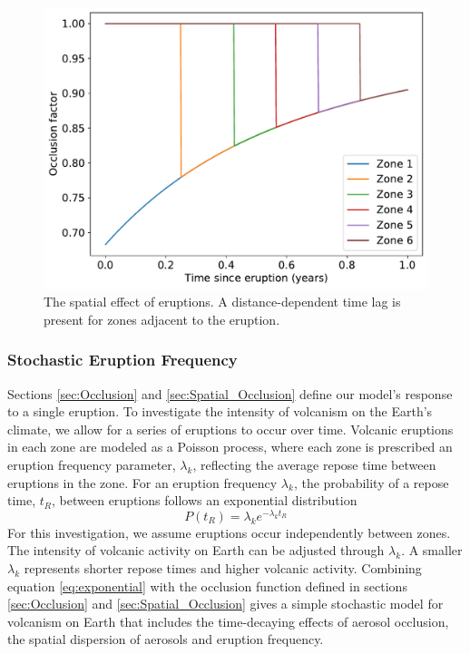 \documentclass[12pt]{article}
\begin{document}
\begin{figure}[H]
    \centering
    \includegraphics[scale=0.6]{occlusion_space.pdf}
    \caption{
        The spatial effect of eruptions. A distance-dependent time lag is
        present for zones adjacent to the eruption.
    }
    \label{fig:occlusion_space}
\end{figure}
\FloatBarrier

\subsubsection{Stochastic Eruption Frequency} \label{sec:Stochastic}
Sections \ref{sec:Occlusion} and \ref{sec:Spatial_Occlusion} define our model's
response to a single eruption. To investigate the intensity of
volcanism on the Earth's climate, we allow for a series of eruptions to occur
over time. Volcanic eruptions in each zone are modeled as a Poisson
process, where each zone is prescribed an eruption frequency parameter,
$\lambda_k$, reflecting the average repose time between eruptions in the zone.
For an eruption frequency $\lambda_k$, the probability of a repose time, $t_{R}$,
between eruptions follows an exponential distribution
\begin{equation} \label{eq:exponential}
P(t_{R}) = \lambda_k e^{-\lambda_k t_{R}}
\end{equation}
For this investigation, we assume eruptions occur independently between zones. \\

The intensity of volcanic activity on Earth can be adjusted through
$\lambda_k$. A smaller $\lambda_k$ represents shorter repose
times and higher volcanic activity. Combining equation \ref{eq:exponential} with
the occlusion function defined in sections \ref{sec:Occlusion} and
\ref{sec:Spatial_Occlusion} gives a simple stochastic model for volcanism on
Earth that includes the time-decaying effects of aerosol occlusion, the spatial
dispersion of aerosols and eruption frequency.
\end{document}
